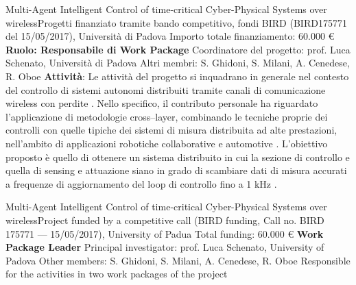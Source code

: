         {Multi-Agent Intelligent Control of time-critical
        Cyber-Physical Systems over wireless}{Progetti finanziato tramite bando competitivo, fondi BIRD (BIRD175771 del 15/05/2017), Università di Padova}
        {\newline
        Importo totale finanziamento: 60.000 €\newline
            \textbf{Ruolo: Responsabile di Work Package}\newline
            Coordinatore del progetto: prof. Luca Schenato, Università di Padova\newline
            Altri membri: S. Ghidoni, S. Milani, A. Cenedese, R. Oboe}
        {\textbf{Attività}: Le attività del progetto si inquadrano in generale nel contesto del controllo di sistemi autonomi distribuiti tramite canali di comunicazione wireless con perdite \cite{Pezzutto:2018,Branz:2019a}. 
Nello specifico, il contributo personale ha riguardato l'applicazione di metodologie cross--layer,
combinando le tecniche proprie dei controlli con quelle tipiche dei sistemi di
misura distribuita ad alte prestazioni, nell'ambito di applicazioni robotiche
collaborative e automotive \cite{Branz:2019}. L'obiettivo proposto è quello di ottenere un sistema
distribuito in cui la sezione di controllo e quella di sensing e attuazione
siano in grado di scambiare dati di misura accurati a frequenze di
aggiornamento del loop di controllo fino a 1 kHz \cite{Branz:2020a}.}


            {Multi-Agent Intelligent Control of time-critical
            Cyber-Physical Systems over wireless}{Project funded by a competitive call (BIRD funding, Call no. BIRD 175771 --- 15/05/2017), University of Padua}
            {\newline
            Total funding: 60.000 €\newline
            	\textbf{Work Package Leader}\newline
                Principal investigator: prof. Luca Schenato, University of Padova\newline
                Other members: S. Ghidoni, S. Milani, A. Cenedese, R. Oboe}
            {Responsible for the activities in two work packages of the project}


